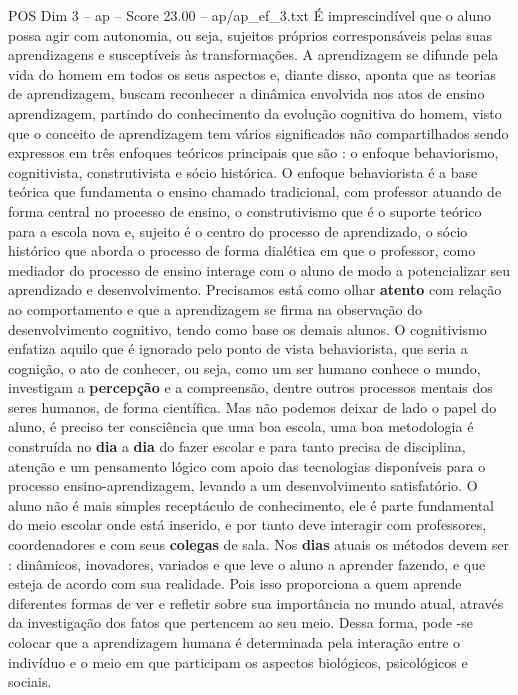 \begin{textsample}{POS Dim 3 – ap – Score 23.00 – ap/ap\_ef\_3.txt}
É imprescindível que o aluno possa agir com autonomia, ou seja, sujeitos próprios corresponsáveis pelas suas aprendizagens e susceptíveis às transformações.
A aprendizagem se difunde pela vida do homem em todos os seus aspectos e, diante disso, aponta que as teorias de aprendizagem, buscam reconhecer a dinâmica envolvida nos atos de ensino aprendizagem, partindo do conhecimento da evolução cognitiva do homem, visto que o conceito de aprendizagem tem vários significados não compartilhados sendo expressos em três enfoques teóricos principais que são : o enfoque behaviorismo, cognitivista, construtivista e sócio histórica.
O enfoque behaviorista é a base teórica que fundamenta o ensino chamado tradicional, com professor atuando de forma central no processo de ensino, o construtivismo que é o suporte teórico para a escola nova e, sujeito é o centro do processo de aprendizado, o sócio histórico que aborda o processo de forma dialética em que o professor, como mediador do processo de ensino interage com o aluno de modo a potencializar seu aprendizado e desenvolvimento.
Precisamos está como olhar \textbf{atento} com relação ao comportamento e que a aprendizagem se firma na observação do desenvolvimento cognitivo, tendo como base os demais alunos.
O cognitivismo enfatiza aquilo que é ignorado pelo ponto de vista behaviorista, que seria a cognição, o ato de conhecer, ou seja, como um ser humano conhece o mundo, investigam a \textbf{percepção} e a compreensão, dentre outros processos mentais dos seres humanos, de forma científica.
Mas não podemos deixar de lado o papel do aluno, é preciso ter consciência que uma boa escola, uma boa metodologia é construída no \textbf{dia} a \textbf{dia} do fazer escolar e para tanto precisa de disciplina, atenção e um pensamento lógico com apoio das tecnologias disponíveis para o processo ensino-aprendizagem, levando a um desenvolvimento satisfatório.
O aluno não é mais simples receptáculo de conhecimento, ele é parte fundamental do meio escolar onde está inserido, e por tanto deve interagir com professores, coordenadores e com seus \textbf{colegas} de sala.
Nos \textbf{dias} atuais os métodos devem ser : dinâmicos, inovadores, variados e que leve o aluno a aprender fazendo, e que esteja de acordo com sua realidade.
Pois isso proporciona a quem aprende diferentes formas de ver e refletir sobre sua importância no mundo atual, através da investigação dos fatos que pertencem ao seu meio.
Dessa forma, pode -se colocar que a aprendizagem humana é determinada pela interação entre o indivíduo e o meio em que participam os aspectos biológicos, psicológicos e sociais.

\end{textsample}
